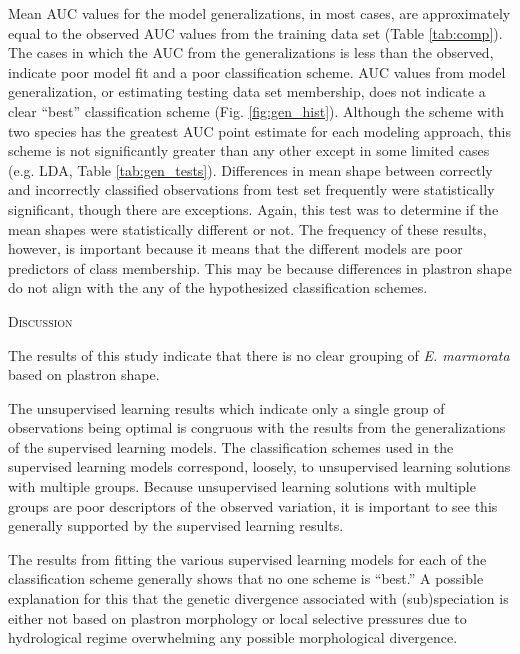 \documentclass[12pt,letterpaper]{article}
\renewcommand{\section}[1]{%
\bigskip
\begin{center}
\begin{Large}
\normalfont\scshape #1
\medskip
\end{Large}
\end{center}}
\begin{document}
Mean AUC values for the model generalizations, in most cases, are approximately equal to the observed AUC values from the training data set (Table \ref{tab:comp}). The  cases in which the AUC from the  generalizations is less than the observed, indicate poor model fit and a poor classification scheme. AUC values from model generalization, or estimating testing data set membership, does not indicate a clear ``best'' classification scheme (Fig. \ref{fig:gen_hist}). Although the scheme with two species has the greatest AUC point estimate for each modeling approach, this scheme is not significantly greater than any other except in some limited cases (e.g. LDA, Table \ref{tab:gen_tests}). 
Differences in mean shape between correctly and incorrectly classified observations from test set frequently were statistically significant, though there are exceptions. Again, this test was to determine if the mean shapes were statistically different or not. The frequency of these results, however, is important because it means that the different models are poor predictors of class membership. This may be because differences in plastron shape do not align with the any of the hypothesized classification schemes.


\section{Discussion}

The results of this study indicate that there is no clear grouping of \textit{E. marmorata} based on plastron shape.

The unsupervised learning results which indicate only a single group of observations being optimal is congruous with the results from the generalizations of the supervised learning models. The classification schemes used in the supervised learning models correspond, loosely, to unsupervised learning solutions with multiple groups. Because unsupervised learning solutions with multiple groups are poor descriptors of the observed variation, it is important to see this generally supported by the supervised learning results.

The results from fitting the various supervised learning models for each of the classification scheme generally shows that no one scheme is ``best.'' A possible explanation for this that the genetic divergence associated with (sub)speciation is either not based on plastron morphology or local selective pressures due to hydrological regime overwhelming any possible morphological divergence.
\end{document}
